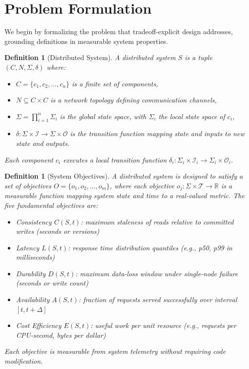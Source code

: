 \documentclass[conference]{IEEEtran}
\newtheorem{definition}[theorem]{Definition}
\begin{document}
\section{Problem Formulation}
\label{sec:problem}

We begin by formalizing the problem that tradeoff-explicit design addresses, grounding definitions in measurable system properties.


\begin{definition}[Distributed System]
A distributed system $S$ is a tuple $(C, N, \Sigma, \delta)$ where:
\begin{itemize}
    \item $C = \{c_1, c_2, \ldots, c_n\}$ is a finite set of components,
    \item $N \subseteq C \times C$ is a network topology defining communication channels,
    \item $\Sigma = \prod_{i=1}^n \Sigma_i$ is the global state space, with $\Sigma_i$ the local state space of $c_i$,
    \item $\delta: \Sigma \times \mathcal{I} \to \Sigma \times \mathcal{O}$ is the transition function mapping state and inputs to new state and outputs.
\end{itemize}
Each component $c_i$ executes a local transition function $\delta_i: \Sigma_i \times \mathcal{I}_i \to \Sigma_i \times \mathcal{O}_i$.
\end{definition}


\begin{definition}[System Objectives]
A distributed system is designed to satisfy a set of objectives $O = \{o_1, o_2, \ldots, o_m\}$, where each objective $o_j: \Sigma \times \mathcal{T} \to \mathbb{R}$ is a measurable function mapping system state and time to a real-valued metric. The five fundamental objectives are:
\begin{itemize}
    \item \textit{Consistency} $C(S,t)$: maximum staleness of reads relative to committed writes (seconds or versions)
    \item \textit{Latency} $L(S,t)$: response time distribution quantiles (e.g., p50, p99 in milliseconds)
    \item \textit{Durability} $D(S,t)$: maximum data-loss window under single-node failure (seconds or write count)
    \item \textit{Availability} $A(S,t)$: fraction of requests served successfully over interval $[t, t+\Delta]$
    \item \textit{Cost Efficiency} $E(S,t)$: useful work per unit resource (e.g., requests per CPU-second, bytes per dollar)
\end{itemize}
Each objective is measurable from system telemetry without requiring code modification.
\end{definition}
\end{document}

